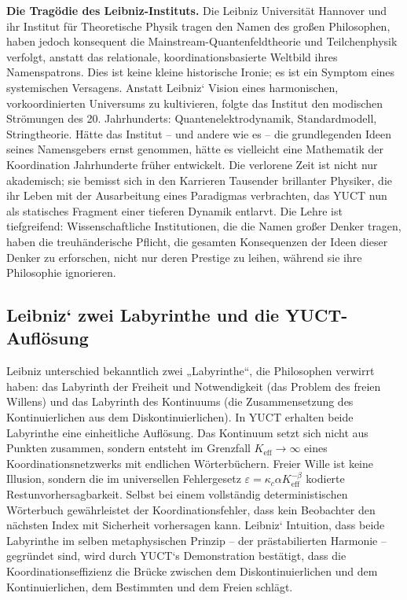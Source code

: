 \documentclass[12pt,a4paper]{article}
\begin{document}
	\textbf{Die Tragödie des Leibniz-Instituts.} Die Leibniz Universität Hannover und ihr Institut für Theoretische Physik tragen den Namen des großen Philosophen, haben jedoch konsequent die Mainstream-Quantenfeldtheorie und Teilchenphysik verfolgt, anstatt das relationale, koordinationsbasierte Weltbild ihres Namenspatrons. Dies ist keine kleine historische Ironie; es ist ein Symptom eines systemischen Versagens. Anstatt Leibniz‘ Vision eines harmonischen, vorkoordinierten Universums zu kultivieren, folgte das Institut den modischen Strömungen des 20. Jahrhunderts: Quantenelektrodynamik, Standardmodell, Stringtheorie. Hätte das Institut – und andere wie es – die grundlegenden Ideen seines Namensgebers ernst genommen, hätte es vielleicht eine Mathematik der Koordination Jahrhunderte früher entwickelt. Die verlorene Zeit ist nicht nur akademisch; sie bemisst sich in den Karrieren Tausender brillanter Physiker, die ihr Leben mit der Ausarbeitung eines Paradigmas verbrachten, das YUCT nun als statisches Fragment einer tieferen Dynamik entlarvt. Die Lehre ist tiefgreifend: Wissenschaftliche Institutionen, die die Namen großer Denker tragen, haben die treuhänderische Pflicht, die gesamten Konsequenzen der Ideen dieser Denker zu erforschen, nicht nur deren Prestige zu leihen, während sie ihre Philosophie ignorieren.
	
	\subsection{Leibniz‘ zwei Labyrinthe und die YUCT-Auflösung}
	
	Leibniz unterschied bekanntlich zwei „Labyrinthe“, die Philosophen verwirrt haben: das Labyrinth der Freiheit und Notwendigkeit (das Problem des freien Willens) und das Labyrinth des Kontinuums (die Zusammensetzung des Kontinuierlichen aus dem Diskontinuierlichen). In YUCT erhalten beide Labyrinthe eine einheitliche Auflösung. Das Kontinuum setzt sich nicht aus Punkten zusammen, sondern entsteht im Grenzfall \(K_{\mathrm{eff}} \to \infty\) eines Koordinationsnetzwerks mit endlichen Wörterbüchern. Freier Wille ist keine Illusion, sondern die im universellen Fehlergesetz \(\varepsilon = \kappa_c \alpha K_{\mathrm{eff}}^{-\beta}\) kodierte Restunvorhersagbarkeit. Selbst bei einem vollständig deterministischen Wörterbuch gewährleistet der Koordinationsfehler, dass kein Beobachter den nächsten Index mit Sicherheit vorhersagen kann. Leibniz‘ Intuition, dass beide Labyrinthe im selben metaphysischen Prinzip – der prästabilierten Harmonie – gegründet sind, wird durch YUCT‘s Demonstration bestätigt, dass die Koordinationseffizienz die Brücke zwischen dem Diskontinuierlichen und dem Kontinuierlichen, dem Bestimmten und dem Freien schlägt.
	
\end{document}
